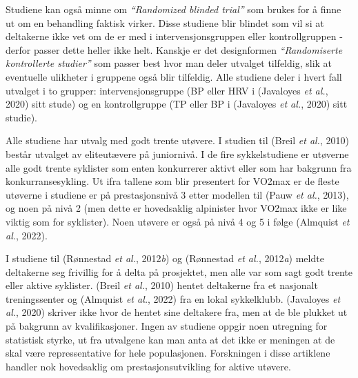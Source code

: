 \documentclass[
  letterpaper,
  DIV=11,
  numbers=noendperiod]{scrreprt}
\begin{document}
Studiene kan også minne om \emph{``Randomized blinded trial''} som
brukes for å finne ut om en behandling faktisk virker. Disse studiene
blir blindet som vil si at deltakerne ikke vet om de er med i
intervensjonsgruppen eller kontrollgruppen - derfor passer dette heller
ikke helt. Kanskje er det designformen \emph{``Randomiserte kontrollerte
studier''} som passer best hvor man deler utvalget tilfeldig, slik at
eventuelle ulikheter i gruppene også blir tilfeldig. Alle studiene deler
i hvert fall utvalget i to grupper: intervensjonsgruppe (BP eller HRV i
(Javaloyes \emph{et al.}, 2020) sitt stude) og en kontrollgruppe (TP
eller BP i (Javaloyes \emph{et al.}, 2020) sitt studie).

Alle studiene har utvalg med godt trente utøvere. I studien til (Breil
\emph{et al.}, 2010) består utvalget av eliteutævere på juniornivå. I de
fire sykkelstudiene er utøverne alle godt trente syklister som enten
konkurrerer aktivt eller som har bakgrunn fra konkurransesykling. Ut
ifra tallene som blir presentert for VO2max er de fleste utøverne i
studiene er på prestasjonsnivå 3 etter modellen til (Pauw \emph{et al.},
2013), og noen på nivå 2 (men dette er hovedsaklig alpinister hvor
VO2max ikke er like viktig som for syklister). Noen utøvere er også på
nivå 4 og 5 i følge (Almquist \emph{et al.}, 2022).

I studiene til (Rønnestad \emph{et al.}, 2012\emph{b}) og (Rønnestad
\emph{et al.}, 2012\emph{a}) meldte deltakerne seg frivillig for å delta
på prosjektet, men alle var som sagt godt trente eller aktive syklister.
(Breil \emph{et al.}, 2010) hentet deltakerne fra et nasjonalt
treningssenter og (Almquist \emph{et al.}, 2022) fra en lokal
sykkelklubb. (Javaloyes \emph{et al.}, 2020) skriver ikke hvor de hentet
sine deltakere fra, men at de ble plukket ut på bakgrunn av
kvalifikasjoner. Ingen av studiene oppgir noen utregning for statistisk
styrke, ut fra utvalgene kan man anta at det ikke er meningen at de skal
være repressentative for hele populasjonen. Forskningen i disse
artiklene handler nok hovedsaklig om prestasjonsutvikling for aktive
utøvere.
\end{document}
